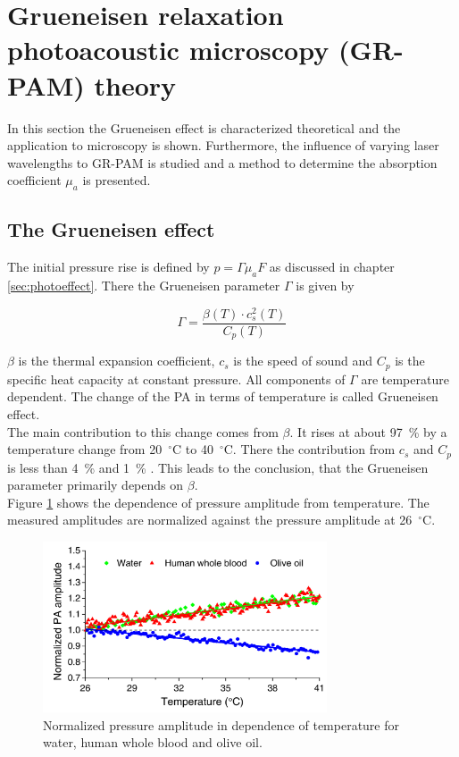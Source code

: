 \section{Grueneisen relaxation photoacoustic microscopy (GR-PAM) theory}

In this section the Grueneisen effect is characterized theoretical and the application to microscopy is shown. Furthermore, the influence of varying laser wavelengths to GR-PAM is studied and a method to determine the absorption coefficient $\mu_a$ is presented. 

\subsection{The Grueneisen effect}
\label{sec:GReffect}
The initial pressure rise is defined by $p = \Gamma \mu_a F$ as discussed in chapter \ref{sec:photoeffect}. There the Grueneisen parameter $\Gamma$ is given by

\begin{equation}
\Gamma = \frac{\beta(T) \cdot c_s^2(T)}{C_p(T)}
\label{eq:gamma(T)}
\end{equation}

$\beta$ is the thermal expansion coefficient, $c_s$ is the speed of sound and $C_p$ is the specific heat capacity at constant pressure. All components of $\Gamma$ are temperature dependent. The change of the PA in terms of temperature is called Grueneisen effect. \\
The main contribution to this change comes from $\beta$. It rises at about 97~\% by a temperature change from 20~$^\circ$C to 40~$^\circ$C. There the contribution from $c_s$ and $C_p$ is less than 4~\% and 1~\% \cite{waterproperties, Tian:dualPulse}. 
This leads to the conclusion, that the Grueneisen parameter primarily depends on $\beta$. \\
Figure \ref{fig:GeffectPaper} shows the dependence of pressure amplitude from temperature. The measured amplitudes are normalized against the pressure amplitude at 26~$^\circ$C. 

\begin{figure}[H]
	\centering
	\includegraphics[width = 0.75\textwidth, height=0.3\textheight]{03_GR-PAM_theory/images/GeffectPaper.jpeg}
	\caption{Normalized pressure amplitude in dependence of temperature for water, human whole blood and olive oil. \cite{Tian:15}}
	\label{fig:GeffectPaper}
\end{figure}

